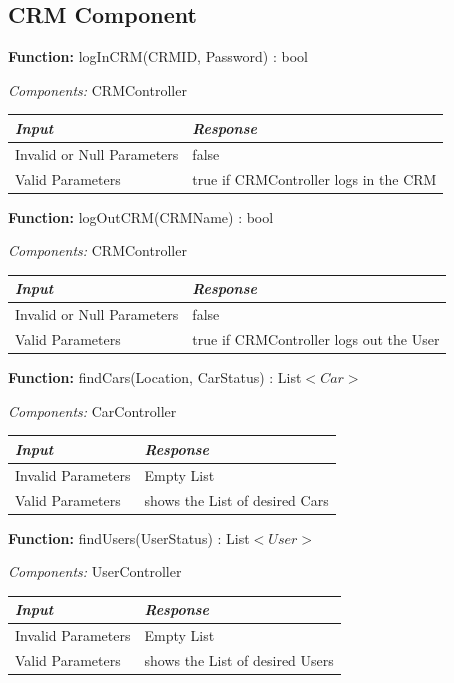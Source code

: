 \documentclass[a4paper]{article}
\begin{document}
\subsection{CRM Component}
\textbf{Function:} logInCRM(CRMID, Password) : bool \par
\textit{Components:} CRMController
\begin{center}
\begin{tabular}{ | L{6cm} | L{6cm} | }
\hline
	\textit{Input}& \textit{Response}\\ \hline
	Invalid or Null Parameters & false\\ \hline
	Valid Parameters & true if CRMController logs in the CRM\\ \hline
\end{tabular}
\end{center}
\textbf{Function:} logOutCRM(CRMName) : bool \par
\textit{Components:} CRMController
\begin{center}
\begin{tabular}{ | L{6cm} | L{6cm} | }
\hline
	\textit{Input}& \textit{Response}\\ \hline
	Invalid or Null Parameters & false\\ \hline
	Valid Parameters & true if CRMController logs out the User\\ \hline
\end{tabular}
\end{center}
\textbf{Function:} findCars(Location, CarStatus) : List\(<Car>\) \par
\textit{Components:} CarController
\begin{center}
\begin{tabular}{ | L{6cm} | L{6cm} | }
\hline
	\textit{Input}& \textit{Response}\\ \hline
	Invalid Parameters & Empty List\\ \hline
	Valid Parameters & shows the List of desired Cars\\ \hline
\end{tabular}
\end{center}
\textbf{Function:} findUsers(UserStatus) : List\(<User>\) \par
\textit{Components:} UserController
\begin{center}
\begin{tabular}{ | L{6cm} | L{6cm} | }
\hline
	\textit{Input}& \textit{Response}\\ \hline
	Invalid Parameters & Empty List\\ \hline
	Valid Parameters & shows the List of desired Users\\ \hline
\end{tabular}
\end{center}
\newpage
\end{document}
